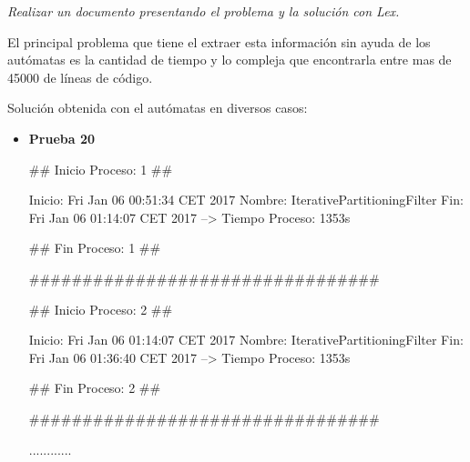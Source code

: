 \textit{Realizar un documento presentando el problema y la solución con Lex.} \newline

El principal problema que tiene el extraer esta información sin ayuda de los autómatas es la cantidad de tiempo y lo compleja que encontrarla entre mas de 45000 de líneas de código. \newline

Solución obtenida con el autómatas en diversos casos:

\begin{itemize}
	\item \textbf{Prueba 20} \newline
	
	\#\# Inicio Proceso: 1 \#\# \newline \newline
	
	Inicio: Fri Jan 06 00:51:34 CET 2017\newline
	Nombre: IterativePartitioningFilter\newline
	Fin: Fri Jan 06 01:14:07 CET 2017\newline
	--> Tiempo Proceso: 1353s\newline \newline
	
	\#\# Fin Proceso: 1 \#\# \newline \newline
	
	\#\#\#\#\#\#\#\#\#\#\#\#\#\#\#\#\#\#\#\#\#\#\#\#\#\#\#\#\#\#\#\#\# \newline \newline
	
	\#\# Inicio Proceso: 2 \#\# \newline
	
	Inicio: Fri Jan 06 01:14:07 CET 2017\newline
	Nombre: IterativePartitioningFilter\newline
	Fin: Fri Jan 06 01:36:40 CET 2017\newline
	--> Tiempo Proceso: 1353s\newline \newline
	
	\#\# Fin Proceso: 2 \#\# \newline
	
	\#\#\#\#\#\#\#\#\#\#\#\#\#\#\#\#\#\#\#\#\#\#\#\#\#\#\#\#\#\#\#\#\# \newline
	
	............\newline
	

\end{itemize}
